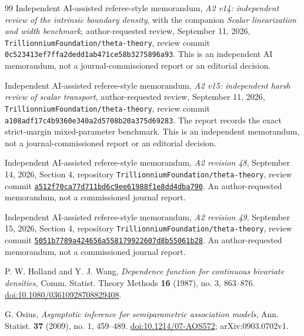 \begin{thebibliography}{99}
Independent AI-assisted referee-style memorandum,
\emph{A2 v14: independent review of the intrinsic boundary density},
with the companion \emph{Scalar linearization and width benchmark},
author-requested review, September 11, 2026,
\texttt{Trillionnium\allowbreak Foundation/\allowbreak theta-theory},
review commit \texttt{0c523413\allowbreak ef7ffa2d\allowbreak edd1ab47\allowbreak 1ce58b32\allowbreak 75896a93}.
This is an independent AI memorandum, not a journal-commissioned report
or an editorial decision.

Independent AI-assisted referee-style memorandum,
\emph{A2 v15: independent harsh review of scalar transport},
author-requested review, September 11, 2026,
\texttt{Trillionnium\allowbreak Foundation/\allowbreak theta-theory},
review commit \texttt{a108adf1\allowbreak 7c4b9360\allowbreak e340a2d5\allowbreak 708b20a3\allowbreak 75d69283}.
The report records the exact strict-margin mixed-parameter benchmark.
This is an independent memorandum, not a journal-commissioned report
or an editorial decision.

Independent AI-assisted referee-style memorandum,
\emph{A2 revision 48}, September 14, 2026, Section 4,
repository \texttt{Trillionnium\allowbreak Foundation/\allowbreak theta-theory},
review commit
\href{https://github.com/TrillionniumFoundation/theta-theory/commit/a512f70ca77d711bd6c9ee61988f1e8dd4dba790}{\texttt{a512f70c\allowbreak a77d711b\allowbreak d6c9ee61\allowbreak 988f1e8d\allowbreak d4dba790}}.
An author-requested memorandum, not a commissioned journal report.


Independent AI-assisted referee-style memorandum,
\emph{A2 revision 49}, September 15, 2026, Section 4,
repository \texttt{Trillionnium\allowbreak Foundation/\allowbreak theta-theory},
review commit
\href{https://github.com/TrillionniumFoundation/theta-theory/commit/5051b7789a424656a558179922607d8b55061b28}{\texttt{5051b778\allowbreak 9a424656\allowbreak a5581799\allowbreak 22607d8b\allowbreak 55061b28}}.
An author-requested memorandum, not a commissioned journal report.


P. W. Holland and Y. J. Wang, \emph{Dependence function for continuous
bivariate densities}, Comm. Statist. Theory Methods \textbf{16} (1987),
no. 3, 863--876. \href{https://doi.org/10.1080/03610928708829408}{doi:10.1080/03610928708829408}.

G. Osius, \emph{Asymptotic inference for semiparametric association models},
Ann. Statist. \textbf{37} (2009), no. 1, 459--489.
\href{https://doi.org/10.1214/07-AOS572}{doi:10.1214/07-AOS572}; arXiv:0903.0702v1.



\end{thebibliography}
